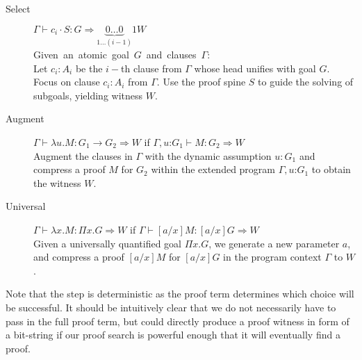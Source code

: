 \documentclass{llncs}
\newcommand{\fighead}{\hrule\vspace{1.5ex}}
\newcommand{\vd}{\vdash}
\newcommand{\arrow}{\rightarrow}
\newcommand{\oftp}{\mathord{:}}
\begin{document}
\begin{small}
\begin{description}
\item[Select] $\Gamma \vd c_i \cdot S: G \Rightarrow
  \underset{1 \ldots (i-1)}{\underbrace{0\ldots 0}}1
W $ \\
    \mbox{Given an atomic goal $G$ and clauses $\Gamma$:}\hfill\\
     Let $c_i : A_i$ be the $i-$th clause from $\Gamma$ whose head 
     unifies with goal $G$.\\
    Focus on clause $c_i : A_i$ from $\Gamma$. Use the proof spine $S$ 
    to guide the solving of subgoals, yielding witness $W$.

\item[Augment] $\Gamma \vd   \lambda u. M : G_1 \arrow G_2 \Rightarrow
  W$ if $\Gamma,
  u\oftp G_1 \vd M : G_2 \Rightarrow W$ \\
Augment the clauses in $\Gamma$ with the dynamic assumption $u{:} G_1$ and
compress a proof $M$ for $G_2$ within the extended program
$\Gamma, u \oftp G_1$ to obtain the witness $W$. 
\item[Universal] $\Gamma \vd  \lambda x. M : \Pi x. G \Rightarrow W$ if $\Gamma \vd
  [a/x]M: [a/x]G\Rightarrow W$  \\ %
Given a universally quantified goal $\Pi x. G$, we generate a new
parameter $a$, and compress a proof $[a/x]M$  for $[a/x]G$ in the
program context $\Gamma$ to $W$.\\
\end{description}
\end{small}    
%

Note that the {} step is deterministic as the proof term
determines which choice will be successful. It should be intuitively
clear that we do not necessarily have to pass in the full proof term,
but could directly produce a proof witness in form of a bit-string if
our proof search is powerful enough that it will eventually find a
proof.
\end{document}
